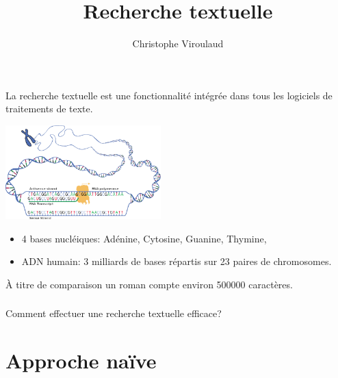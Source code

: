 \documentclass[svgnames,11pt]{beamer}
\author[]{Christophe Viroulaud}
\title{Recherche textuelle}
\date{\framebox{\textbf{Algo 27}}}
\institute{Terminale - NSI}
\begin{document}
\begin{frame}
\titlepage
\end{frame}

\begin{frame}

    La recherche textuelle est une fonctionnalité intégrée dans tous les logiciels de traitements de texte.
\end{frame}
\begin{frame}
\begin{center}
\centering
\includegraphics[width=6cm]{ressources/adn.png}
\label{adn}
\end{center}

\begin{itemize}
    \item 4 bases nucléiques: Adénine, Cytosine, Guanine, Thymine,
    \item ADN humain: 3 milliards de bases répartis sur 23 paires de chromosomes.
\end{itemize}
\begin{aretenir}[Remarque]
À titre de comparaison un roman compte environ 500000 caractères.
\end{aretenir}
\end{frame}
\begin{frame}
    \frametitle{}
\begin{framed}
    \centering Comment effectuer une recherche textuelle efficace?
\end{framed}

\end{frame}
\section{Approche naïve}
\end{document}
